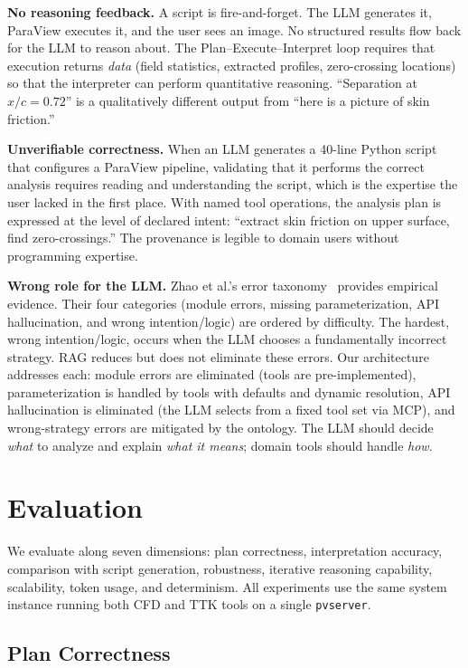 \documentclass{vgtc}                          %
\begin{document}
\textbf{No reasoning feedback.}
A script is fire-and-forget.
The LLM generates it, ParaView executes it, and the user sees an image.
No structured results flow back for the LLM to reason about.
The Plan--Execute--Interpret loop requires that execution returns
\textit{data} (field statistics, extracted profiles, zero-crossing
locations) so that the interpreter can perform quantitative reasoning.
``Separation at $x/c = 0.72$'' is a qualitatively different output from
``here is a picture of skin friction.''

\textbf{Unverifiable correctness.}
When an LLM generates a 40-line Python script that configures a ParaView
pipeline, validating that it performs the correct analysis requires reading
and understanding the script, which is the expertise the user lacked in the
first place.
With named tool operations, the analysis plan is expressed at the level of
declared intent: ``extract skin friction on upper surface, find
zero-crossings.''
The provenance is legible to domain users without programming expertise.

\textbf{Wrong role for the LLM.}
Zhao et al.'s error taxonomy~\cite{Zhao:2026:RAG} provides empirical evidence.
Their four categories (module errors, missing parameterization, API
hallucination, and wrong intention/logic) are ordered by difficulty.
The hardest, wrong intention/logic, occurs when the LLM chooses a fundamentally
incorrect strategy.
RAG reduces but does not eliminate these errors.
Our architecture addresses each: module errors are eliminated (tools are
pre-implemented), parameterization is handled by tools with defaults and
dynamic resolution, API hallucination is eliminated (the LLM selects from
a fixed tool set via MCP), and wrong-strategy errors are mitigated by the
ontology.
The LLM should decide \textit{what} to analyze and explain \textit{what it
means}; domain tools should handle \textit{how}.


\section{Evaluation}

We evaluate along seven dimensions: plan correctness, interpretation accuracy,
comparison with script generation, robustness, iterative reasoning capability,
scalability, token usage, and determinism.
All experiments use the same system instance running both CFD and TTK tools on
a single \texttt{pvserver}.

\subsection{Plan Correctness}
\end{document}
